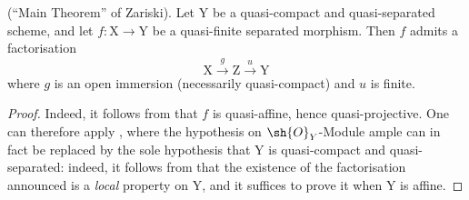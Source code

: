 \begin{corollary}[18.12.13]
\label{IV.18.12.13}
(``Main Theorem'' of Zariski).
Let $\mathrm{Y}$ be a quasi-compact and quasi-separated scheme, and let $f:\mathrm{X}\to\mathrm{Y}$ be a quasi-finite separated morphism.
Then $f$ admits a factorisation
\[
  \mathrm{X}\xrightarrow{g}\mathrm{Z}\xrightarrow{u}\mathrm{Y}
\]
where $g$ is an open immersion (necessarily quasi-compact) and $u$ is finite.
\end{corollary}

\begin{proof}
Indeed, it follows from  that $f$ is quasi-affine, hence quasi-projective.
One can therefore apply , where the hypothesis on $\sh{O}_Y$-Module ample can in fact be replaced by the sole hypothesis that $\mathrm{Y}$ is quasi-compact and quasi-separated: indeed, it follows from  that the existence of the factorisation announced is a \emph{local} property on $\mathrm{Y}$, and it suffices to prove it when $\mathrm{Y}$ is affine.
\end{proof}

